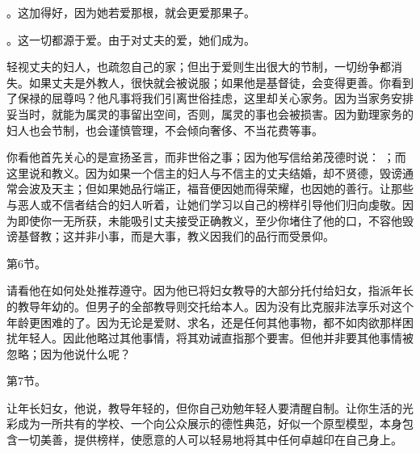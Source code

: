 。这加得好，因为她若爱那根，就会更爱那果子。\par

。这一切都源于爱。由于对丈夫的爱，她们成为。\par

 \par

轻视丈夫的妇人，也疏忽自己的家；但出于爱则生出很大的节制，一切纷争都消失。如果丈夫是外教人，很快就会被说服；如果他是基督徒，会变得更善。你看到了保禄的屈尊吗？他凡事将我们引离世俗挂虑，这里却关心家务。因为当家务安排妥当时，就能为属灵的事留出空间，否则，属灵的事也会被损害。因为勤理家务的妇人也会节制，也会谨慎管理，不会倾向奢侈、不当花费等事。\par

 \par

你看他首先关心的是宣扬圣言，而非世俗之事；因为他写信给弟茂德时说： ；而这里说和教义。因为如果一个信主的妇人与不信主的丈夫结婚，却不贤德，毁谤通常会波及天主；但如果她品行端正，福音便因她而得荣耀，也因她的善行。让那些与恶人或不信者结合的妇人听着，让她们学习以自己的榜样引导他们归向虔敬。因为即使你一无所获，未能吸引丈夫接受正确教义，至少你堵住了他的口，不容他毁谤基督教；这并非小事，而是大事，教义因我们的品行而受景仰。\par

第6节。 \par

请看他在如何处处推荐遵守。因为他已将妇女教导的大部分托付给妇女，指派年长的教导年幼的。但男子的全部教导则交托给本人。因为没有比克服非法享乐对这个年龄更困难的了。因为无论是爱财、求名，还是任何其他事物，都不如肉欲那样困扰年轻人。因此他略过其他事情，将其劝诫直指那个要害。但他并非要其他事情被忽略；因为他说什么呢？\par

第7节。\par

让年长妇女，他说，教导年轻的，但你自己劝勉年轻人要清醒自制。让你生活的光彩成为一所共有的学校、一个向公众展示的德性典范，好似一个原型模型，本身包含一切美善，提供榜样，使愿意的人可以轻易地将其中任何卓越印在自己身上。\par

